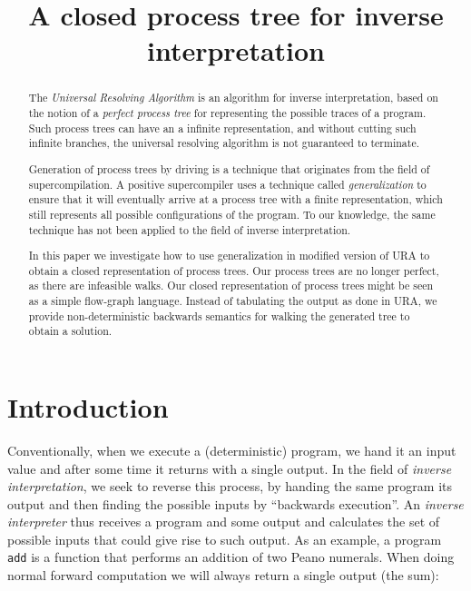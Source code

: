 \documentclass[10pt]{../sigplanconf}
\title{A closed process tree for inverse interpretation}
\begin{document}
\maketitle

\begin{abstract}
  The \textit{Universal Resolving
    Algorithm} \cite{abramov2000universal} is an algorithm for inverse
  interpretation, based on the notion of a \textit{perfect process
    tree} \cite{gluck1993occam} for representing the possible traces
  of a program. Such process trees can have an a infinite
  representation, and without cutting such infinite branches, the
  universal resolving algorithm is not guaranteed to terminate.

  Generation of process trees by driving is a technique that
  originates from the field of
  supercompilation\cite{sorensen1998introduction}. A positive
  supercompiler uses a technique called \emph{generalization} to
  ensure that it will eventually arrive at a process tree with a
  finite representation, which still represents all possible
  configurations of the program. To our knowledge, the same technique
  has not been applied to the field of inverse interpretation.

  In this paper we investigate how to use generalization in modified
  version of URA to obtain a closed representation of process
  trees. Our process trees are no longer perfect, as there are
  infeasible walks. Our closed representation of process trees might
  be seen as a simple flow-graph language. Instead of tabulating the
  output as done in URA, we provide non-deterministic backwards
  semantics for walking the generated tree to obtain a solution.
\end{abstract}




\section{Introduction}
Conventionally, when we execute a (deterministic) program, we hand it
an input value and after some time it returns with a single output. In
the field of \textit{inverse interpretation}, we seek to reverse this
process, by handing the same program its output and then finding the
possible inputs by ``backwards execution''. An \textit{inverse
  interpreter} thus receives a program and some output and calculates
the set of possible inputs that could give rise to such output. As an
example, a program \texttt{add} is a function that performs an
addition of two Peano numerals. When doing normal forward computation
we will always return a single output (the sum):\\
\end{document}
